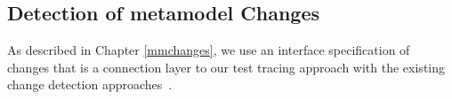\subsection{Detection of metamodel Changes}\label{sec:changes}



As described in Chapter \ref{mmchanges}, we use an interface specification of changes {\small{}} that is a connection layer to our test tracing approach with the existing change detection approaches~\cite{Alter2015, williams2012searching,cicchetti_managing_2009,langer_posteriori_2013,vermolen_reconstructing_2012,Khelladi2016}.

